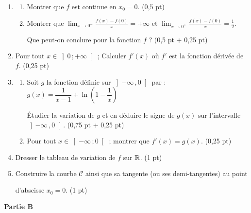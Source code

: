 \begin{enumerate}
	\item
	\begin{enumerate}
		\item Montrer que $f$ est continue en $x_0 = 0$. \hfill (0,5 pt)
		\item Montrer que $\displaystyle\lim_{x\to0^-}\frac{f(x)-f(0)}{x} = +\infty$ et $\displaystyle\lim_{x\to0^+}\frac{f(x)-f(0)}{x} = \frac{1}{2}$.

		Que peut-on conclure pour la fonction $f$ ? \hfill (0,5 pt + 0,25 pt)
	\end{enumerate}
	\item Pour tout $x \in \left]0\,;+\infty\right[$ ; Calculer $f'(x)$ où $f'$ est la fonction dérivée de $f$. \hfill (0,25 pt)
	\item
	\begin{enumerate}
		\item Soit $g$ la fonction définie sur $\left]-\infty\,,0\right[$ par : $g(x) = \dfrac{1}{x-1} + \ln\!\left(1-\dfrac{1}{x}\right)$

		Étudier la variation de $g$ et en déduire le signe de $g(x)$ sur l'intervalle $\left]-\infty\,,0\right[$. \hfill (0,75 pt + 0,25 pt)
		\item Pour tout $x \in \left]-\infty\,;0\right[$ ; montrer que $f'(x) = g(x)$. \hfill (0,25 pt)
	\end{enumerate}
	\item Dresser le tableau de variation de $f$ sur $\mathbb{R}$. \hfill (1 pt)
	\item Construire la courbe $\mathscr{C}$ ainsi que sa tangente (ou ses demi-tangentes) au point

	d'abscisse $x_0 = 0$. \hfill (1 pt)
\end{enumerate}

\medskip
\noindent\textbf{Partie B}

